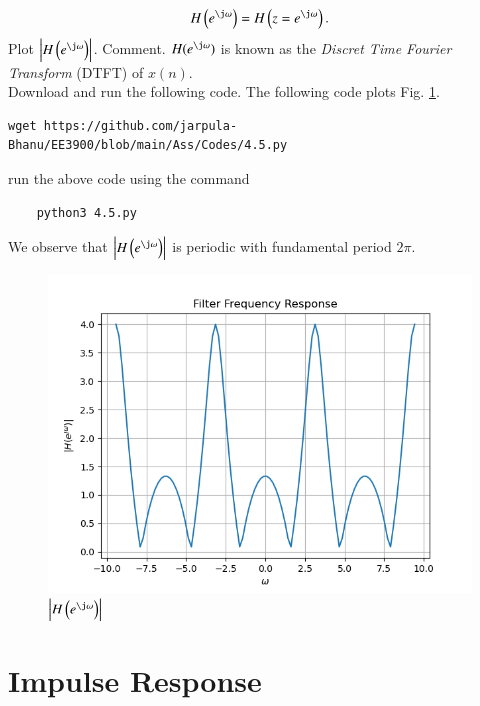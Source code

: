 \documentclass[journal,12pt,twocolumn]{IEEEtran}
\renewcommand\thesection{\arabic{section}}
\begin{document}
\begin{enumerate}[label=\thesection.\arabic*
,ref=\thesection.\theenumi]
\begin{equation}
H\brak{e^{\j \omega}} = H\brak{z = e^{\j \omega}}.
\end{equation}
Plot $\abs{H\brak{e^{\j \omega}}}$.  Comment.  $H(e^{\j \omega})$ is
known as the {\em Discret Time Fourier Transform} (DTFT) of $x(n)$.
\\
\solution Download and run the following code. The following code plots Fig. \ref{fig:dtft}.
\begin{lstlisting}
wget https://github.com/jarpula-Bhanu/EE3900/blob/main/Ass/Codes/4.5.py
\end{lstlisting}
run the above code using the command 
\begin{lstlisting}
	python3 4.5.py
\end{lstlisting}
We observe that $\abs{H\brak{e^{\j \omega}}}$ is periodic with fundamental period $2\pi$.
\begin{figure}[!ht]
\centering
\includegraphics[width=\columnwidth]{./figs/4.5.png}
\caption{$\abs{H\brak{e^{\j\omega}}}$}
\label{fig:dtft}
\end{figure}

\end{enumerate}

\section{Impulse Response}
\end{document}
